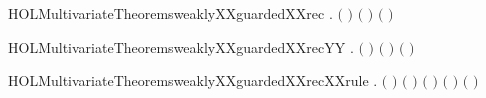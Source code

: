 \newcommand{\HOLMultivariateTheoremsweaklyXXguardedXXprefixXXrule}{\UseVerbatim{HOLMultivariateTheoremsweaklyXXguardedXXprefixXXrule}}
\begin{SaveVerbatim}{HOLMultivariateTheoremsweaklyXXguardedXXrec}
\HOLTokenTurnstile{} \HOLSymConst{\HOLTokenForall{}}  .
         \ensuremath{(}  \ensuremath{)} \HOLSymConst{\HOLTokenImp{}}
       \HOLSymConst{\HOLTokenNeg{}}   \HOLSymConst{\HOLTokenConj{}}  \ensuremath{(} \ensuremath{)} \ensuremath{(} \ensuremath{)}
\end{SaveVerbatim}
\newcommand{\HOLMultivariateTheoremsweaklyXXguardedXXrec}{\UseVerbatim{HOLMultivariateTheoremsweaklyXXguardedXXrec}}
\begin{SaveVerbatim}{HOLMultivariateTheoremsweaklyXXguardedXXrecYY}
\HOLTokenTurnstile{} \HOLSymConst{\HOLTokenForall{}}  .
         \ensuremath{(}  \ensuremath{)} \HOLSymConst{\HOLTokenImp{}}
       \HOLSymConst{\HOLTokenNeg{}}   \HOLSymConst{\HOLTokenConj{}}  \ensuremath{(} \ensuremath{)} \ensuremath{(} \ensuremath{)} \HOLSymConst{\HOLTokenConj{}}
         
\end{SaveVerbatim}
\newcommand{\HOLMultivariateTheoremsweaklyXXguardedXXrecYY}{\UseVerbatim{HOLMultivariateTheoremsweaklyXXguardedXXrecYY}}
\begin{SaveVerbatim}{HOLMultivariateTheoremsweaklyXXguardedXXrecXXrule}
\HOLTokenTurnstile{} \HOLSymConst{\HOLTokenForall{}}  .
       \HOLSymConst{\HOLTokenNeg{}}   \HOLSymConst{\HOLTokenConj{}}  \ensuremath{(} \ensuremath{)} \ensuremath{(} \ensuremath{)} \HOLSymConst{\HOLTokenConj{}}
        \ensuremath{(} \ensuremath{)} \ensuremath{(} \ensuremath{)} \HOLSymConst{\HOLTokenImp{}}
         \ensuremath{(}  \ensuremath{)}
\end{SaveVerbatim}

